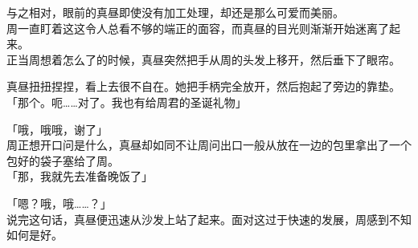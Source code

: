 与之相对，眼前的真昼即使没有加工处理，却还是那么可爱而美丽。\\

周一直盯着这这令人总看不够的端正的面容，而真昼的目光则渐渐开始迷离了起来。\\

正当周想着怎么了的时候，真昼突然把手从周的头发上移开，然后垂下了眼帘。

真昼扭扭捏捏，看上去很不自在。她把手柄完全放开，然后抱起了旁边的靠垫。\\

「那个。呃……对了。我也有给周君的圣诞礼物」

「哦，哦哦，谢了」\\

周正想开口问是什么，真昼却如同不让周问出口一般从放在一边的包里拿出了一个包好的袋子塞给了周。\\

「那，我就先去准备晚饭了」

「嗯？哦，哦……？」\\

说完这句话，真昼便迅速从沙发上站了起来。面对这过于快速的发展，周感到不知如何是好。


